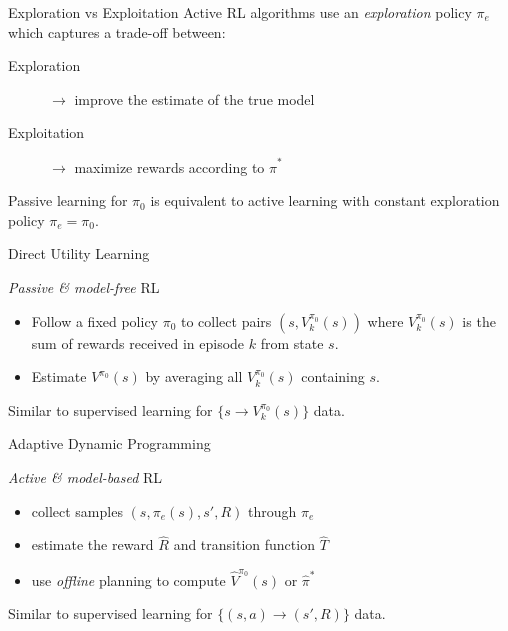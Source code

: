 \documentclass{cognito}
\begin{document}
\begin{note}{Exploration vs Exploitation}
	Active RL algorithms use an \emph{exploration} policy $\pi_e$ which captures a trade-off between:
	\begin{description}
		\item[Exploration] $\to$ improve the estimate of the true model
		\item[Exploitation] $\to$ maximize rewards according to $\hat{\pi}^*$
	\end{description}
	\begin{remark}
		Passive learning for $\pi_0$ is equivalent to active learning with constant exploration policy $\pi_e = \pi_0$.
	\end{remark}
	\vspace{-5pt}
\end{note}

\begin{note}{Direct Utility Learning}
	\begin{mdframed}[linecolor=black!25!white]
		\emph{Passive \& model-free} RL
	\end{mdframed}
	\begin{itemize}
		\item Follow a fixed policy $\pi_0$ to collect pairs $(s, V^{\pi_0}_k(s))$ where $V^{\pi_0}_k(s)$ is the sum of rewards
		received in episode $k$ from state $s$.
		\item Estimate $V^{\pi_0}(s)$ by averaging all $V^{\pi_0}_k(s)$ containing $s$.
	\end{itemize}
	\begin{remark} Similar to supervised learning for $\{ s \to  V^{\pi_0}_k(s) \}$ data.\end{remark}
	\vspace{-5pt}
\end{note}

\begin{note}{Adaptive Dynamic Programming}
	\begin{mdframed}[linecolor=black!25!white]
		\emph{Active \& model-based} RL
	\end{mdframed}
	\begin{itemize}
	\item collect samples $(s, \pi_e(s), s', R)$ through $\pi_e$
	\item estimate the reward $\hat{R}$ and transition function $\hat{T}$
	\item use \emph{offline} planning to compute $\hat{V}^{\pi_0}(s)$ or $\hat{\pi}^*$
	\end{itemize}
	\begin{remark} Similar to supervised learning for $\{ (s, a) \to (s',R) \}$ data.
	\end{remark}
	\vspace{-5pt}
\end{note}
\end{document}
